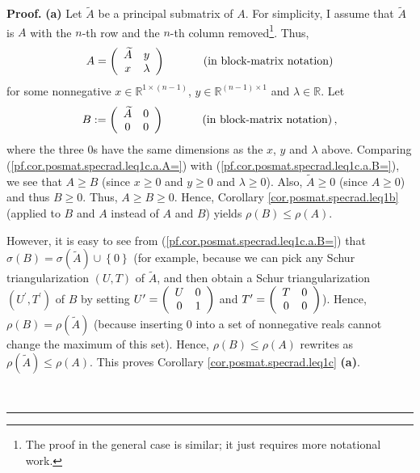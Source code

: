 \documentclass[numbers=enddot,12pt,final,onecolumn,notitlepage]{scrartcl}%
\numberwithin{exer}{subsection}
\theoremstyle{definition}
\newenvironment{proof}[1][Proof]{\noindent\textbf{#1.} }{\ \rule{0.5em}{0.5em}}
\begin{document}
\begin{proof}
\textbf{(a)} Let $\widetilde{A}$ be a principal submatrix of $A$. For
simplicity, I assume that $\widetilde{A}$ is $A$ with the $n$-th row and the
$n$-th column removed\footnote{The proof in the general case is similar; it
just requires more notational work.}. Thus,%
\begin{equation}
A=\left(
\begin{array}
[c]{cc}%
\widetilde{A} & y\\
x & \lambda
\end{array}
\right)  \ \ \ \ \ \ \ \ \ \ \left(  \text{in block-matrix notation}\right)
\label{pf.cor.posmat.specrad.leq1c.a.A=}%
\end{equation}
for some nonnegative $x\in\mathbb{R}^{1\times\left(  n-1\right)  }$,
$y\in\mathbb{R}^{\left(  n-1\right)  \times1}$ and $\lambda\in\mathbb{R}$.
Let
\begin{equation}
B:=\left(
\begin{array}
[c]{cc}%
\widetilde{A} & 0\\
0 & 0
\end{array}
\right)  \ \ \ \ \ \ \ \ \ \ \left(  \text{in block-matrix notation}\right)  ,
\label{pf.cor.posmat.specrad.leq1c.a.B=}%
\end{equation}
where the three $0$s have the same dimensions as the $x$, $y$ and $\lambda$
above. Comparing (\ref{pf.cor.posmat.specrad.leq1c.a.A=}) with
(\ref{pf.cor.posmat.specrad.leq1c.a.B=}), we see that $A\geq B$ (since
$x\geq0$ and $y\geq0$ and $\lambda\geq0$). Also, $\widetilde{A}\geq0$ (since
$A\geq0$) and thus $B\geq0$. Thus, $A\geq B\geq0$. Hence, Corollary
\ref{cor.posmat.specrad.leq1b} (applied to $B$ and $A$ instead of $A$ and $B$)
yields $\rho\left(  B\right)  \leq\rho\left(  A\right)  $.

However, it is easy to see from (\ref{pf.cor.posmat.specrad.leq1c.a.B=}) that
$\sigma\left(  B\right)  =\sigma\left(  \widetilde{A}\right)  \cup\left\{
0\right\}  $ (for example, because we can pick any Schur triangularization
$\left(  U,T\right)  $ of $\widetilde{A}$, and then obtain a Schur
triangularization $\left(  U^{\prime},T^{\prime}\right)  $ of $B$ by setting
$U^{\prime}=\left(
\begin{array}
[c]{cc}%
U & 0\\
0 & 1
\end{array}
\right)  $ and $T^{\prime}=\left(
\begin{array}
[c]{cc}%
T & 0\\
0 & 0
\end{array}
\right)  $). Hence, $\rho\left(  B\right)  =\rho\left(  \widetilde{A}\right)
$ (because inserting $0$ into a set of nonnegative reals cannot change the
maximum of this set). Hence, $\rho\left(  B\right)  \leq\rho\left(  A\right)
$ rewrites as $\rho\left(  \widetilde{A}\right)  \leq\rho\left(  A\right)  $.
This proves Corollary \ref{cor.posmat.specrad.leq1c} \textbf{(a)}. \medskip


\end{proof}
\end{document}
